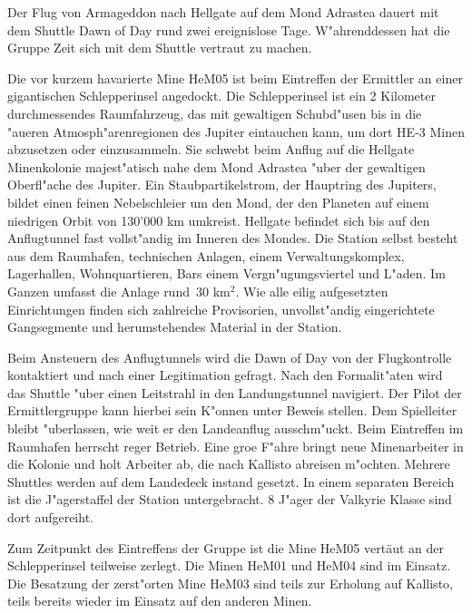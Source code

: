 \pagebreak
{}

Der Flug von Armageddon nach Hellgate auf dem Mond Adrastea dauert mit dem Shuttle Dawn of Day rund zwei ereignislose Tage. W"ahrenddessen hat die Gruppe Zeit sich mit dem Shuttle vertraut zu machen. 

Die vor kurzem havarierte Mine HeM05 ist beim Eintreffen der Ermittler an einer gigantischen Schlepperinsel  angedockt. Die Schlepperinsel ist ein 2 Kilometer durchmessendes Raumfahrzeug, das mit gewaltigen Schubd"usen bis in die "au\3eren Atmosph"arenregionen des Jupiter eintauchen kann, um dort HE-3 Minen abzusetzen oder einzusammeln. Sie schwebt beim Anflug auf die Hellgate Minenkolonie majest"atisch nahe dem Mond Adrastea "uber der gewaltigen Oberfl"ache des Jupiter. Ein Staubpartikelstrom, der Hauptring des Jupiters, bildet einen feinen Nebelschleier um den Mond, der den Planeten auf einem niedrigen Orbit von 130'000 km umkreist. Hellgate befindet sich bis auf den Anflugtunnel fast vollst"andig im Inneren des Mondes. Die Station selbst besteht aus dem Raumhafen, technischen Anlagen, einem Verwaltungskomplex, Lagerhallen, Wohnquartieren, Bars einem Vergn"ugungsviertel und L"aden. Im Ganzen umfasst die Anlage rund~30 km$^{2}$. Wie alle eilig aufgesetzten Einrichtungen finden sich zahlreiche Provisorien, unvollst"andig eingerichtete Gangsegmente und herumstehendes Material in der Station.

Beim Ansteuern des Anflugtunnels wird die Dawn of Day von der Flugkontrolle kontaktiert und nach einer Legitimation gefragt. Nach den  Formalit"aten wird das Shuttle "uber einen Leitstrahl in den Landungstunnel navigiert. Der Pilot der Ermittlergruppe kann hierbei sein K"onnen unter Beweis stellen. Dem Spielleiter bleibt "uberlassen, wie weit er den Landeanflug ausschm"uckt. Beim Eintreffen im Raumhafen herrscht reger Betrieb. Eine gro\3e F"ahre bringt neue Minenarbeiter in die Kolonie und holt Arbeiter ab, die nach Kallisto abreisen m"ochten. Mehrere Shuttles werden auf dem Landedeck instand gesetzt. In einem separaten Bereich ist die J"agerstaffel der Station untergebracht. 8 J"ager der Valkyrie Klasse sind dort aufgereiht. 

Zum Zeitpunkt des Eintreffens der Gruppe ist die Mine HeM05 vertäut an der Schlepperinsel teilweise zerlegt. Die Minen HeM01 und HeM04 sind im Einsatz. Die Besatzung der zerst"orten Mine HeM03 sind teils zur Erholung auf Kallisto, teils bereits wieder im Einsatz auf den anderen Minen.


